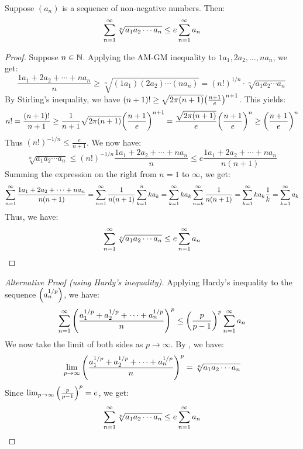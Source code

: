 \documentclass[main.tex]{subfiles}
\begin{document}
\begin{theorem}\label{carleman_inequality}
    Suppose $(a_n)$ is a sequence of non-negative numbers. Then:
    \begin{equation*}
        \sumn\sqrt[n]{a_1a_2\cdots a_n}\le e\sumn a_n
    \end{equation*}
\end{theorem}
\begin{proof}
    Suppose $n\in\N$. Applying the AM-GM inequality to $1a_1,2a_2,\ldots,na_n$, we get:
    \begin{equation*}
        \frac{1a_1+2a_2+\cdots+na_n}{n}\ge\sqrt[n]{(1a_1)(2a_2)\cdots(na_n)}=(n!)^{1/n}\cdot\sqrt[n]{a_1a_2\cdots a_n}
    \end{equation*}
    By Stirling's inequality, we have $(n+1)!\ge\sqrt{2\pi(n+1)}\qty(\frac{n+1}{e})^{n+1}$. This yields:
    \begin{equation*}
        n!= \frac{(n+1)!}{n+1}\ge\frac{1}{n+1}\sqrt{2\pi(n+1)}\qty(\frac{n+1}{e})^{n+1}= \frac{\sqrt{2\pi(n+1)}}{e}\qty(\frac{n+1}{e})^n\ge\qty(\frac{n+1}{e})^n
    \end{equation*}
    Thus $(n!)^{-1/n}\le\frac{e}{n+1}$. We now have:
    \begin{equation*}
        \sqrt[n]{a_1a_2\cdots a_n}\le(n!)^{-1/n}\frac{1a_1+2a_2+\cdots+na_n}{n}\le e\frac{1a_1+2a_2+\cdots+na_n}{n(n+1)}
    \end{equation*}
    Summing the expression on the right from $n=1$ to $\infty$, we get:
    \begin{align*}
        \sumn\frac{1a_1+2a_2+\cdots+na_n}{n(n+1)}
        = \sumn\frac{1}{n(n+1)}\sumkn ka_k= \sumk ka_k\sumn[k] \frac{1}{n(n+1)}
        = \sumk ka_k\frac{1}{k}
        = \sumk a_k
    \end{align*}
    Thus, we have:
    \begin{equation*}
        \sumn\sqrt[n]{a_1a_2\cdots a_n}\le e\sumn a_n
    \end{equation*}
\end{proof}
\begin{proof}[Alternative Proof (using Hardy's inequality)]
    Applying Hardy's inequality to the sequence $\qty(a_n^{1/p})$, we have:
    \begin{equation*}
        \sumn\qty(\frac{a_1^{1/p}+a_2^{1/p}+\cdots+a_n^{1/p}}{n})^p\le\qty(\frac{p}{p-1})^p\sumn a_n
    \end{equation*}
    We now take the limit of both sides as $p\to\infty$. By , we have:
    \begin{equation*}
        \lim_{p\to\infty} \qty(\frac{a_1^{1/p}+a_2^{1/p}+\cdots+a_n^{1/p}}{n})^p
        = \sqrt[n]{a_1a_2\cdots a_n}
    \end{equation*}
    Since $\lim_{p\to\infty} \qty(\frac{p}{p-1})^p=e$, we get:
    \begin{equation*}
        \sumn\sqrt[n]{a_1a_2\cdots a_n}\le e\sumn a_n
    \end{equation*}
\end{proof}
\end{document}

